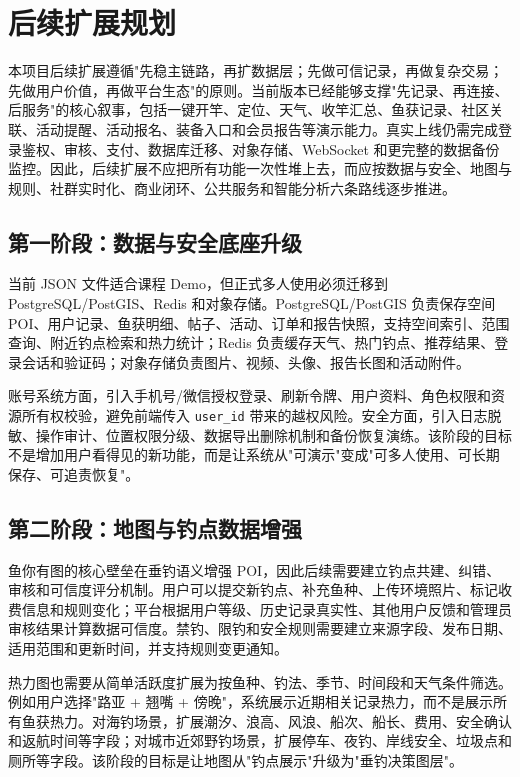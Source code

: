 \section{后续扩展规划}

本项目后续扩展遵循"先稳主链路，再扩数据层；先做可信记录，再做复杂交易；先做用户价值，再做平台生态"的原则。当前版本已经能够支撑"先记录、再连接、后服务"的核心叙事，包括一键开竿、定位、天气、收竿汇总、鱼获记录、社区关联、活动提醒、活动报名、装备入口和会员报告等演示能力。真实上线仍需完成登录鉴权、审核、支付、数据库迁移、对象存储、WebSocket 和更完整的数据备份监控。因此，后续扩展不应把所有功能一次性堆上去，而应按数据与安全、地图与规则、社群实时化、商业闭环、公共服务和智能分析六条路线逐步推进。

\subsection{第一阶段：数据与安全底座升级}

当前 JSON 文件适合课程 Demo，但正式多人使用必须迁移到 PostgreSQL/PostGIS、Redis 和对象存储。PostgreSQL/PostGIS 负责保存空间 POI、用户记录、鱼获明细、帖子、活动、订单和报告快照，支持空间索引、范围查询、附近钓点检索和热力统计；Redis 负责缓存天气、热门钓点、推荐结果、登录会话和验证码；对象存储负责图片、视频、头像、报告长图和活动附件。

账号系统方面，引入手机号/微信授权登录、刷新令牌、用户资料、角色权限和资源所有权校验，避免前端传入 \texttt{user\_id} 带来的越权风险。安全方面，引入日志脱敏、操作审计、位置权限分级、数据导出删除机制和备份恢复演练。该阶段的目标不是增加用户看得见的新功能，而是让系统从"可演示"变成"可多人使用、可长期保存、可追责恢复"。

\subsection{第二阶段：地图与钓点数据增强}

鱼你有图的核心壁垒在垂钓语义增强 POI，因此后续需要建立钓点共建、纠错、审核和可信度评分机制。用户可以提交新钓点、补充鱼种、上传环境照片、标记收费信息和规则变化；平台根据用户等级、历史记录真实性、其他用户反馈和管理员审核结果计算数据可信度。禁钓、限钓和安全规则需要建立来源字段、发布日期、适用范围和更新时间，并支持规则变更通知。

热力图也需要从简单活跃度扩展为按鱼种、钓法、季节、时间段和天气条件筛选。例如用户选择"路亚 + 翘嘴 + 傍晚"，系统展示近期相关记录热力，而不是展示所有鱼获热力。对海钓场景，扩展潮汐、浪高、风浪、船次、船长、费用、安全确认和返航时间等字段；对城市近郊野钓场景，扩展停车、夜钓、岸线安全、垃圾点和厕所等字段。该阶段的目标是让地图从"钓点展示"升级为"垂钓决策图层"。

